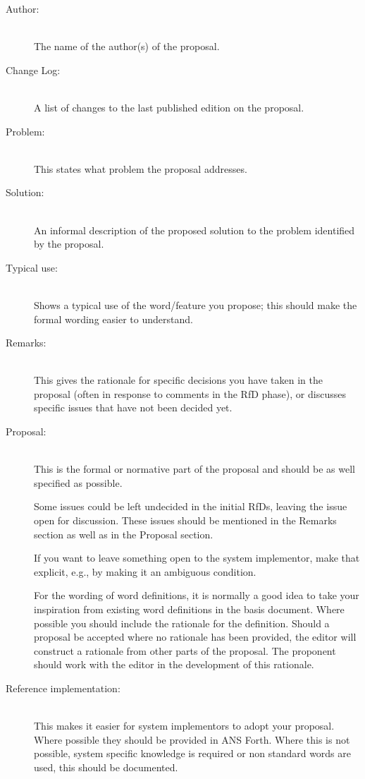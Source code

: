 \begin{description}
\item[Author:] ~\\
	The name of the author(s) of the proposal.

\item[Change Log:] ~\\
	A list of changes to the last published edition on the proposal.

\item[Problem:] ~\\
	This states what problem the proposal addresses.

\item[Solution:] ~\\
	An informal description of the proposed solution to the problem
	identified by the proposal.

\item[Typical use:] ~\\
	Shows a typical use of the word/feature you propose; this should
	make the formal wording easier to understand.

\item[Remarks:] ~\\
	This gives the rationale for specific decisions you have taken in
	the proposal (often in response to comments in the RfD phase), or
	discusses specific issues that have not been decided yet.

\item[Proposal:] ~\\
	This is the formal or normative part of the proposal and should be
	as well specified as possible.

	Some issues could be left undecided in the initial RfDs, leaving
	the issue open for discussion.  These issues should be mentioned
	in the Remarks section as well as in the Proposal section.

	If you want to leave something open to the system implementor, make
	that explicit, e.g., by making it an ambiguous condition.

	For the wording of word definitions, it is normally a good idea to
	take your inspiration from existing word definitions in the basis
	document.  Where possible you should include the rationale for the
	definition.  Should a proposal be accepted where no rationale has
	been provided, the editor will construct a rationale from other
	parts of the proposal.  The proponent should work with the editor
	in the development of this rationale.

\item[Reference implementation:] ~\\
	This makes it easier for system implementors to adopt your proposal.
	Where possible they should be provided in ANS Forth.  Where this is
	not possible, system specific knowledge is required or non standard
	words are used, this should be documented.


\end{description}
